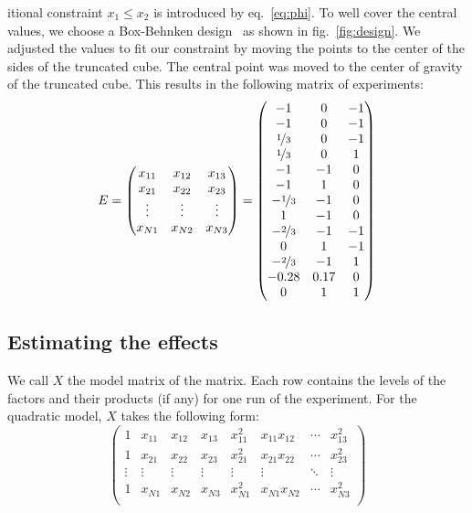 itional constraint $ x_1 \le x_2 $ is introduced by eq.~\ref{eq:phi}. To well cover the central values, we choose a Box-Behnken design~\cite{box_behnken} as shown in fig.~\ref{fig:design}. We adjusted the values to fit our constraint by moving the points to the center of the sides of the truncated cube. The central point was moved to the center of gravity of the truncated cube. This results in the following matrix of experiments:
\begin{equation}
E = \begin{pmatrix}
		x_{11}  &  x_{12}  & x_{13} \\
		x_{21}  &  x_{22}  & x_{23} \\
		\vdots & \vdots & \vdots \\
		x_{N1} & x_{N2} & x_{N3}
		\end{pmatrix} = \begin{pmatrix}
		-1  &  0  & -1 \\
		-1  &  0  & -1 \\
		\nicefrac{1}{3} &	0	& -1 \\
		\nicefrac{1}{3} &	0	& 1  \\
		-1	&	-1	& 0 \\
		-1	&	1	& 0 \\
		-\nicefrac{1}{3} &	-1	& 0 \\
		1	  & -1  & 0 \\
		-\nicefrac{2}{3} &	-1	& -1 \\
		0	  &  1	& -1 \\
		-\nicefrac{2}{3} &	-1	& 1 \\
		-0.28 & 0.17 & 0 \\
		0 	& 1 	& 1 
		\end{pmatrix}
\end{equation}



\subsection{Estimating the effects}
We call $X$ the model matrix of the matrix. Each row contains the levels of the factors and their products (if any) for one run of the experiment. For the quadratic model, $X$ takes the following form:
\begin{equation}
	\begin{pmatrix}
	1 & x_{11} & x_{12} & x_{13} & x_{11}^2 & x_{11} x_{12} & \cdots & x_{13}^2 \\
	1 & x_{21} & x_{22} & x_{23} & x_{21}^2 & x_{21} x_{22} & \cdots & x_{23}^2 \\
	 \vdots & \vdots & \vdots & \vdots & \vdots & \vdots & \ddots & \vdots\\
	1 & x_{N1} & x_{N2} & x_{N3} & x_{N1}^2 & x_{N1} x_{N2} & \cdots & x_{N3}^2 \\
	\end{pmatrix}
\end{equation}

